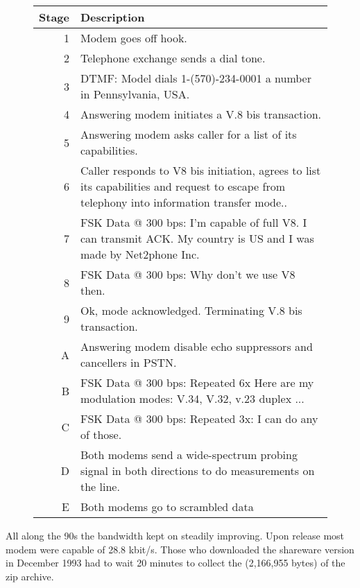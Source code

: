  \begin{figure}[H]
\centering  
\begin{tabularx}{\textwidth}{ R{0.1} L{1.9} }
  \toprule
  \textbf{Stage} &  \textbf{Description} \\
  \toprule 
   
   1 & Modem goes off hook.\\
   2 & Telephone exchange sends a dial tone.\\
   3 & DTMF: Model dials 1-(570)-234-0001 a number in Pennsylvania, USA.\\
   4 & Answering modem initiates a V.8 bis transaction.\\
   5 & Answering modem asks caller for a list of its capabilities.\\
   6 & Caller responds to V8 bis initiation, agrees to list its capabilities and request to escape from telephony into information transfer mode..\\
   7 & FSK Data @ 300 bps: I'm capable of full V8. I can transmit ACK. My country is US and I was made by Net2phone Inc.\\
   8 & FSK Data @ 300 bps: Why don't we use V8 then.\\
   9 & Ok, mode acknowledged. Terminating V.8 bis transaction.\\
   \toprule 
   A & Answering modem disable echo suppressors and cancellers in PSTN.\\
   B & FSK Data @ 300 bps: Repeated 6x Here are my modulation modes: V.34, V.32, v.23 duplex ...\\
   C & FSK Data @ 300 bps: Repeated 3x: I can do any of those. \\
   D & Both modems send a wide-spectrum probing signal in both directions to do measurements on the line.\\
   E & Both modems go to scrambled data \\
   \toprule
\end{tabularx}
\caption{}
\end{figure}
\par




All along the 90s the bandwidth kept on steadily improving. Upon \doom{} release most modem were capable of 28.8 kbit/s. Those who downloaded the shareware version in December 1993 had to wait 20 minutes to collect the (2,166,955 bytes) of the zip archive.\\
\par


